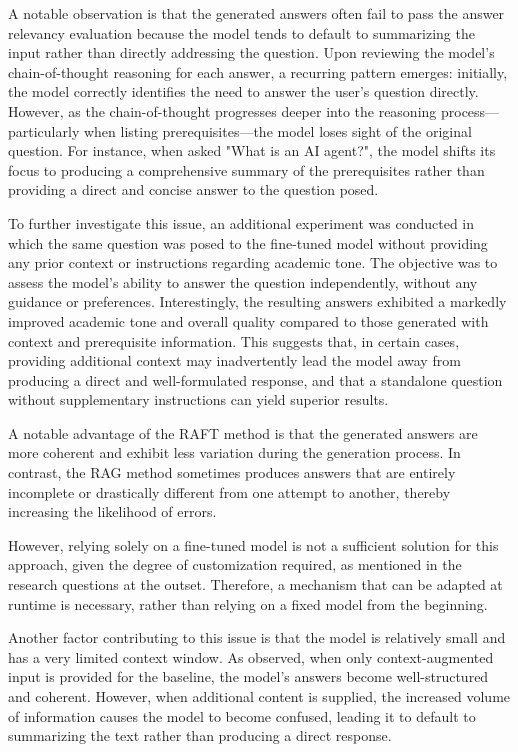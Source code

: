 A notable observation is that the generated answers often fail to pass the answer relevancy evaluation because the model tends to default to summarizing the input rather than directly addressing the question. Upon reviewing the model's chain-of-thought reasoning for each answer, a recurring pattern emerges: initially, the model correctly identifies the need to answer the user's question directly. However, as the chain-of-thought progresses deeper into the reasoning process---particularly when listing prerequisites---the model loses sight of the original question. For instance, when asked "What is an AI agent?", the model shifts its focus to producing a comprehensive summary of the prerequisites rather than providing a direct and concise answer to the question posed.

To further investigate this issue, an additional experiment was conducted in which the same question was posed to the fine-tuned model without providing any prior context or instructions regarding academic tone. The objective was to assess the model's ability to answer the question independently, without any guidance or preferences. Interestingly, the resulting answers exhibited a markedly improved academic tone and overall quality compared to those generated with context and prerequisite information. This suggests that, in certain cases, providing additional context may inadvertently lead the model away from producing a direct and well-formulated response, and that a standalone question without supplementary instructions can yield superior results.

A notable advantage of the RAFT method is that the generated answers are more coherent and exhibit less variation during the generation process. In contrast, the RAG method sometimes produces answers that are entirely incomplete or drastically different from one attempt to another, thereby increasing the likelihood of errors.

However, relying solely on a fine-tuned model is not a sufficient solution for this approach, given the degree of customization required, as mentioned in the research questions at the outset. Therefore, a mechanism that can be adapted at runtime is necessary, rather than relying on a fixed model from the beginning.

Another factor contributing to this issue is that the model is relatively small and has a very limited context window. As observed, when only context-augmented input is provided for the baseline, the model's answers become well-structured and coherent. However, when additional content is supplied, the increased volume of information causes the model to become confused, leading it to default to summarizing the text rather than producing a direct response.